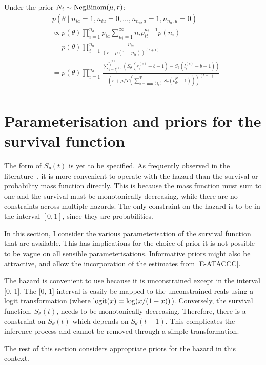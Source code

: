 \documentclass[thesis.tex]{subfiles}
\begin{document}
Under the prior $N_i \sim \text{NegBinom}(\mu, r)$:
\begin{align}
&p(\theta \mid n_{ia} = 1, n_{iu} = 0, \dots, n_{n_a,a} = 1, n_{n_a,u} = 0) \\
&\propto p(\theta) \prod_{i=1}^{n_a} p_{ia} \sum_{n_i=1}^\infty n_i p_{it}^{n_i- 1} p(n_i) \\
&= p(\theta) \prod_{i=1}^{n_a} \frac{p_{ia}}{(r+\mu (1-p_{it}))^{(r+1)}} \\
&= p(\theta) \prod_{i=1}^{n_a} \frac{\sum_{b=l_i^{(b)}}^{r_i^{(b)}} \left( S_\theta(r_i^{(e)} - b - 1) - S_\theta(l_i^{(e)} - b - 1) \right)}{\left( r+\mu/T \left( \sum_{b=\min(t_i)}^T S_\theta(t_{ib}^N + 1) \right) \right)^{(r+1)}} \\
\end{align}

\section{Parameterisation and priors for the survival function} \label{perf-test:sec:parameters-priors}

The form of $S_\theta(t)$ is yet to be specified.
As frequently observed in the literature~\autocite[e.g.:][]{heBayesian}, it is more convenient to operate with the hazard than the survival or probability mass function directly.
This is because the mass function must sum to one and the survival must be monotonically decreasing, while there are no constraints across multiple hazards.
The only constraint on the hazard is to be in the interval $[0, 1]$, since they are probabilities.

In this section, I consider the various parameterisation of the survival function that are available.
This has implications for the choice of prior it is not possible to be vague on all sensible parameterisations.
Informative priors might also be attractive, and allow the incorporation of the estimates from \cref{E-ATACCC}.

The hazard is convenient to use because it is unconstrained except in the interval [0, 1].
The [0, 1] interval is easily be mapped to the unconstrained reals using a logit transformation (where $\operatorname{logit}(x) = \log(x/(1-x))$).
Conversely, the survival function, $S_\theta(t)$, needs to be monotonically decreasing.
Therefore, there is a constraint on $S_\theta(t)$ which depends on $S_\theta(t-1)$.
This complicates the inference process and cannot be removed through a simple transformation.

The rest of this section considers appropriate priors for the hazard in this context.
\end{document}
